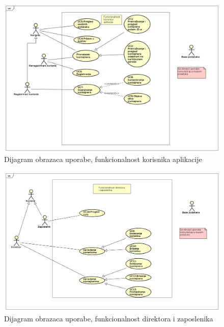             \begin{figure}
                    \centering
                    \includegraphics[width=1.0\linewidth]{slike/Funkcionalnost_korisnika_aplikacije.png}
                    \caption{Dijagram obrazaca uporabe, funkcionalnost korisnika aplikacije}
                    \label{fig:Funkcionalnost korisnika aplikacije}
            \end{figure}
            
            \clearpage
            
            \eject
            
            \begin{figure}
                    \centering
                    \includegraphics[width=1.0\linewidth]{slike/Funkcionalnost_direktora_i_zaposlenika.png}
                    \caption{Dijagram obrazaca uporabe, funkcionalnost direktora i zaposlenika}
                    \label{fig:Funkcionalnost direktora i zaposlenika}
            \end{figure}
            
